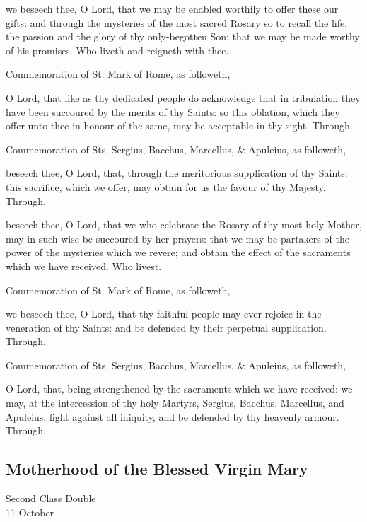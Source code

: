 \secret
{} we beseech thee, O Lord, that we may be enabled worthily to offer these our gifts: and through the mysteries of the most sacred Rosary so to recall the life, the passion and the glory of thy only-begotten Son; that we may be made worthy of his promises. Who liveth and reigneth with thee.
\begin{rubric}
	Commemoration of St. Mark of Rome, as followeth,
\end{rubric}
 O Lord, that like as thy dedicated people do acknowledge that in tribulation they have been succoured by the merits of thy Saints: so this oblation, which they offer unto thee in honour of the same, may be acceptable in thy sight. Through.
\begin{rubric}
	Commemoration of Sts. Sergius, Bacchus, Marcellus, \& Apuleius, as followeth,
\end{rubric}
 beseech thee, O Lord, that, through the meritorious supplication of thy Saints: this sacrifice, which we offer, may obtain for us the favour of thy Majesty. Through.


\postcommunion
{} beseech thee, O Lord, that we who celebrate the Rosary of thy most holy Mother, may in such wise be succoured by her prayers: that we may be partakers of the power of the mysteries which we revere; and obtain the effect of the sacraments which we have received. Who livest.
\begin{rubric}
	Commemoration of St. Mark of Rome, as followeth,
\end{rubric}
 we beseech thee, O Lord, that thy faithful people may ever rejoice in the veneration of thy Saints: and be defended by their perpetual supplication. Through.
\begin{rubric}
	Commemoration of Sts. Sergius, Bacchus, Marcellus, \& Apuleius, as followeth,
\end{rubric}
 O Lord, that, being strengthened by the sacraments which we have received: we may, at the intercession of thy holy Martyrs, Sergius, Bacchus, Marcellus, and Apuleius, fight against all iniquity, and be defended by thy heavenly armour. Through.


\clearpage
\subsection{Motherhood of the Blessed Virgin Mary}
\begin{inhead}
    {Second Class Double\\
11 October}
\end{inhead}

